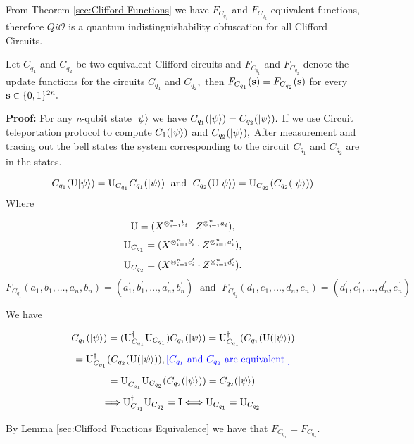 From Theorem \ref{sec:Clifford Functions} we have $F_{C_{q_1}}$ and $F_{C_{q_2}}$ equivalent functions, therefore $Qi\mathcal{O}$ is a quantum indistinguishability obfuscation for all Clifford Circuits.

\begin{theorem}\label{sec:Clifford Functions}
Let $C_{q_1}$ and $C_{q_2}$ be two equivalent Clifford circuits and  $F_{C_{q_1}}$ and $F_{C_{q_2}}$  denote the update functions for the circuits $C_{q_1}$ and $C_{q_2},$ then $F_{C_{q_1}}({\bf s})=F_{C_{q_2}}({\bf s})$ for every ${\bf s}\in\{0,1\}^{2n}.$
\end{theorem}


\begin{flushleft}
{\bf Proof:} For any {\em n}-qubit state ${\lvert}\psi\rangle$ we have $C_{q_1}({\lvert}\psi\rangle)=C_{q_2}({\lvert}\psi\rangle).$ If we use Circuit teleportation protocol to compute $C_1({\lvert}\psi\rangle)$ and $C_{q_2}({\lvert}\psi\rangle),$ After measurement and tracing out the bell states the system corresponding to the circuit $C_{q_1}$ and $C_{q_2}$ are in the states.

$$C_{q_1} ({\rm {\rm U}}{\lvert}\psi\rangle)={\rm {\rm U}}_{C_{q_1}}C_{q_1}({\lvert}\psi\rangle)  \;\mbox{ and }\; C_{q_2} ({\rm {\rm U}}{\lvert}\psi\rangle)={\rm {\rm U}}_{C_{q_2}}(C_{q_2}({\lvert}\psi\rangle))$$
Where

 $${\rm {\rm U}}=( X^{\otimes_{i=1}^{n} b_{i}} \cdot Z^{\otimes_{i=1}^{n} a_{i}}),$$
$${\rm {\rm U}}_{C_{q_1}}=(X^{\otimes_{i=1}^{n} b^\prime_{i}} \cdot Z^{\otimes_{i=1}^{n} a^\prime_{i}}),$$
$${\rm {\rm U}}_{C_{q_2}}=(X^{\otimes_{i=1}^{n} e^\prime_{i}} \cdot Z^{\otimes_{i=1}^{n} d^\prime_{i}}).$$
$$F_{C_{q_1}}(a_1,b_1,\ldots, a_n,b_n)=(a^\prime_1,b^\prime_1,\ldots, a^\prime_n,b^\prime_n) \;\mbox{ and }\; F_{C_{q_2}}(d_1,e_1,\ldots, d_n,e_n)=(d_1^\prime,e_1^\prime,\ldots, d_n^\prime,e^\prime_n)$$

We have

$$C_{q_1}({\lvert}\psi\rangle)=({\rm {\rm U}}_{C_{q_1}}^\dagger {\rm {\rm U}}_{C_{q_1}})C_{q_1}({\lvert}\psi\rangle)={\rm {\rm U}}_{C_{q_1}}^\dagger ( C_{q_1}({\rm {\rm U}}({\lvert}\psi\rangle))$$
$$={\rm {\rm U}}_{C_{q_1}}^\dagger ( C_{q_2}({\rm {\rm U}}({\lvert}\psi\rangle)),  {\color{blue}[C_{q_1} \mbox{ and } C_{q_2} \mbox{ are equivalent } ]}$$
$$={\rm {\rm U}}_{C_{q_1}}^\dagger {\rm {\rm U}}_{C_{q_2}}(C_{q_2}({\lvert}\psi\rangle))=C_{q_2}({\lvert}\psi\rangle)$$
$$\Longrightarrow {\rm {\rm U}}_{C_{q_1}}^\dagger {\rm {\rm U}}_{C_{q_2}}={\bf I}\Longleftrightarrow {\rm {\rm U}}_{C_{q_1}}={\rm {\rm U}}_{C_{q_2}}$$


By Lemma \ref{sec:Clifford Functions Equivalence}  we have that $F_{C_{q_1}}=F_{C_{q_2}}.$
\end{flushleft}

